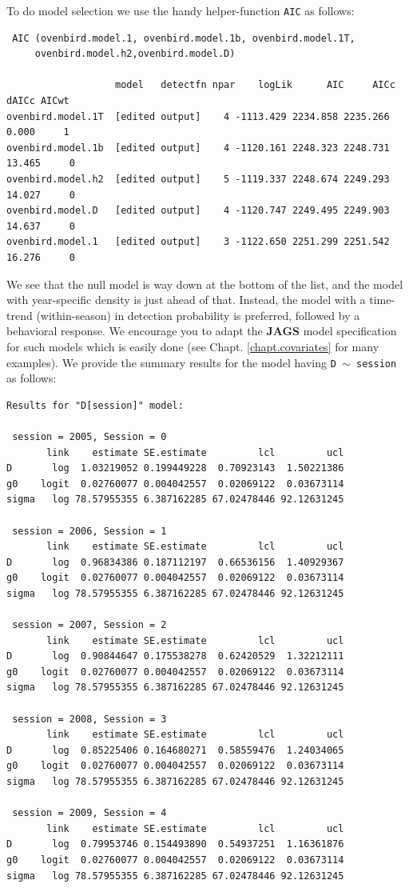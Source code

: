 To do model selection  we use the handy helper-function \mbox{\tt AIC}
as follows:
{\small 
\begin{verbatim}
 AIC (ovenbird.model.1, ovenbird.model.1b, ovenbird.model.1T,
     ovenbird.model.h2,ovenbird.model.D)

                   model   detectfn npar    logLik      AIC     AICc  dAICc AICwt
ovenbird.model.1T  [edited output]    4 -1113.429 2234.858 2235.266  0.000     1
ovenbird.model.1b  [edited output]    4 -1120.161 2248.323 2248.731 13.465     0
ovenbird.model.h2  [edited output]    5 -1119.337 2248.674 2249.293 14.027     0
ovenbird.model.D   [edited output]    4 -1120.747 2249.495 2249.903 14.637     0
ovenbird.model.1   [edited output]    3 -1122.650 2251.299 2251.542 16.276     0
\end{verbatim}
}
We see that the null model is way down at the bottom of the list, and
the model with year-specific density is just ahead of that. Instead,
the model with a time-trend (within-season) in detection probability
is preferred, followed by a behavioral response. We encourage you to
adapt the {\bf JAGS} model specification for such models which is easily
done (see Chapt. \ref{chapt.covariates} for many examples). 
We provide the summary results for the model having \mbox{\tt D $\sim$
  session} as follows:
{\small
\begin{verbatim}
Results for "D[session]" model:

 session = 2005, Session = 0 
       link    estimate SE.estimate         lcl         ucl
D       log  1.03219052 0.199449228  0.70923143  1.50221386
g0    logit  0.02760077 0.004042557  0.02069122  0.03673114
sigma   log 78.57955355 6.387162285 67.02478446 92.12631245

 session = 2006, Session = 1 
       link    estimate SE.estimate         lcl         ucl
D       log  0.96834386 0.187112197  0.66536156  1.40929367
g0    logit  0.02760077 0.004042557  0.02069122  0.03673114
sigma   log 78.57955355 6.387162285 67.02478446 92.12631245

 session = 2007, Session = 2 
       link    estimate SE.estimate         lcl         ucl
D       log  0.90844647 0.175538278  0.62420529  1.32212111
g0    logit  0.02760077 0.004042557  0.02069122  0.03673114
sigma   log 78.57955355 6.387162285 67.02478446 92.12631245

 session = 2008, Session = 3 
       link    estimate SE.estimate         lcl         ucl
D       log  0.85225406 0.164680271  0.58559476  1.24034065
g0    logit  0.02760077 0.004042557  0.02069122  0.03673114
sigma   log 78.57955355 6.387162285 67.02478446 92.12631245

 session = 2009, Session = 4 
       link    estimate SE.estimate         lcl         ucl
D       log  0.79953746 0.154493890  0.54937251  1.16361876
g0    logit  0.02760077 0.004042557  0.02069122  0.03673114
sigma   log 78.57955355 6.387162285 67.02478446 92.12631245
\end{verbatim}
}

